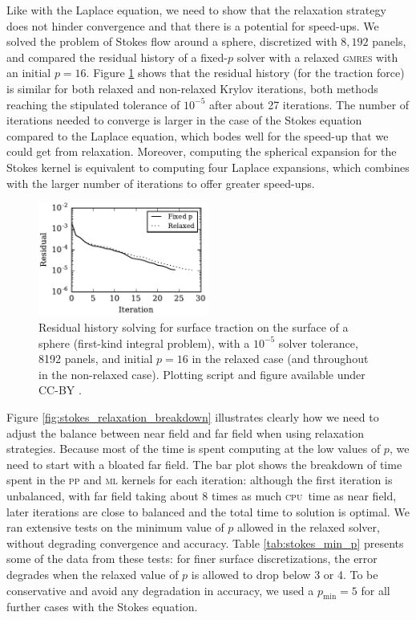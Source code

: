 \documentclass[final,3p,times]{elsarticle}
\newcommand{\cpu}{\textsc{cpu}}
\newcommand{\mtol}{\textsc{m}\texttwooldstyle\textsc{l}\xspace} %
\newcommand{\ptop}{\textsc{p}\texttwooldstyle\textsc{p}\xspace} %
\newcommand{\pmin}{p_{\text{min}}}
\newcommand{\gmres}{\textsc{gmres}\xspace}
\begin{document}
Like with the Laplace equation, we need to show that the relaxation strategy does not hinder convergence and that there is a potential for speed-ups. We solved the problem of Stokes flow around a sphere, discretized with $8,192$ panels, and compared the residual history of a fixed-$p$ solver with a relaxed \gmres with an initial $p=16$. Figure \ref{fig:stokes_residual_history_relaxed} shows that the residual history (for the traction force) is similar for both relaxed and non-relaxed Krylov iterations, both methods reaching the stipulated tolerance of $10^{-5}$ after about 27 iterations.
The number of iterations needed to converge is larger in the case of the Stokes equation compared to the Laplace equation, which bodes well for the speed-up that we could get from relaxation. Moreover, computing the spherical expansion for the Stokes kernel is equivalent to computing four Laplace expansions, which combines with the larger number of iterations to offer greater speed-ups.


\begin{figure}%
\begin{center}
	\includegraphics[natwidth=3in,natheight=2in,width=0.5\textwidth]{StokesResidualHistory.pdf}
	\caption{Residual history solving for surface traction on the surface of a sphere (first-kind integral problem), with a $10^{-5}$ solver tolerance, 8192 panels, and initial $p=16$ in the relaxed case (and throughout in the non-relaxed case). Plotting script and figure available under CC-BY \cite{WangLaytonBarba2016-figshare3}.}
	\label{fig:stokes_residual_history_relaxed}
\end{center}
\end{figure}

Figure \ref{fig:stokes_relaxation_breakdown} illustrates clearly how we need to adjust the balance between near field and far field when using relaxation strategies. Because most of the time is spent computing at the low values of $p$, we need to start with a bloated far field. The bar plot shows the breakdown of time spent in the {\ptop} and {\mtol} kernels for each iteration: although the first iteration is unbalanced, with far field taking about 8 times as much \cpu\ time as near field, later iterations are close to balanced and the total time to solution is optimal. 
We ran extensive tests on the minimum value of $p$ allowed in the relaxed solver, without degrading convergence and accuracy. Table \ref{tab:stokes_min_p} presents some of the data from these tests: for finer surface discretizations, the error degrades when the relaxed value of $p$ is allowed to drop below 3 or 4. To be conservative and avoid any degradation in accuracy, we used a $\pmin=5$ for all further cases with the Stokes equation.
\end{document}
